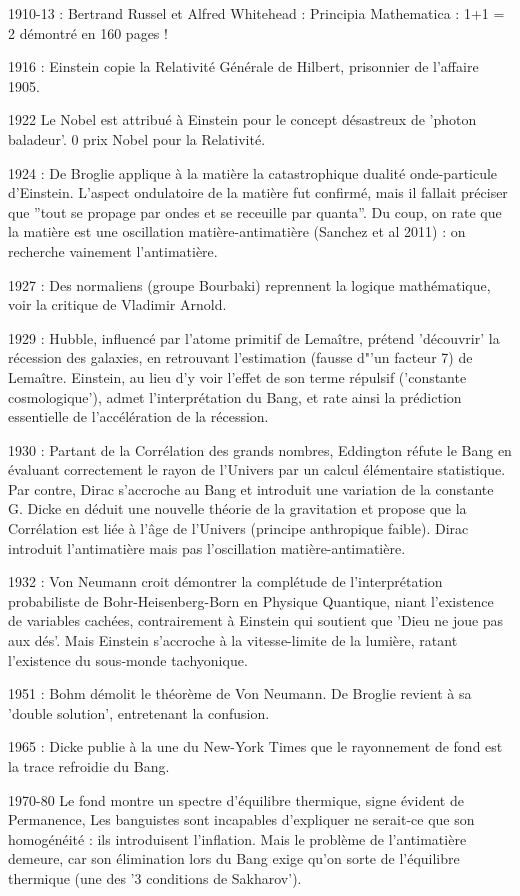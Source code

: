 \documentclass[a4paper,12pt]{article}
\begin{document}
1910-13 : Bertrand Russel et Alfred Whitehead : Principia Mathematica : 1+1 = 2 démontré en 160 pages ! 

1916 : Einstein copie la Relativité Générale de Hilbert, prisonnier de l'affaire 1905.

1922 Le Nobel est attribué à Einstein pour le concept désastreux de 'photon baladeur'. 0 prix Nobel pour la Relativité.

1924 : De Broglie applique à la matière la catastrophique dualité onde-particule d'Einstein. L'aspect ondulatoire de la matière fut confirmé, mais il fallait préciser que ''tout se propage par ondes et se receuille par quanta''. Du coup, on rate que la matière est une oscillation matière-antimatière (Sanchez et al 2011) : on recherche vainement l'antimatière.

1927 : Des normaliens (groupe Bourbaki) reprennent la logique mathématique, voir la critique de Vladimir Arnold.

1929 : Hubble, influencé par l'atome primitif de Lemaître, prétend 'découvrir' la récession des galaxies, en retrouvant l'estimation (fausse d"'un facteur 7) de Lema\^itre. Einstein, au lieu d'y voir l'effet de son terme répulsif ('constante cosmologique'), admet l'interprétation du Bang, et rate ainsi la prédiction essentielle de l'accélération de la récession.

1930 : Partant de la Corrélation des grands nombres, Eddington réfute le Bang en évaluant correctement le rayon de l'Univers par un calcul élémentaire statistique. Par contre, Dirac s'accroche au Bang et introduit une variation de la constante G. Dicke en déduit une nouvelle théorie de la gravitation et propose que la Corrélation est liée à l'âge de l'Univers (principe anthropique faible). Dirac introduit l'antimatière mais pas l'oscillation matière-antimatière.

1932 : Von Neumann croit démontrer la complétude de l'interprétation probabiliste de Bohr-Heisenberg-Born en Physique Quantique, niant l'existence de variables cachées, contrairement à Einstein qui soutient que 'Dieu ne joue pas aux dés'. Mais Einstein s'accroche à la vitesse-limite de la lumière, ratant l'existence du sous-monde tachyonique.

1951 : Bohm démolit le théorème de Von Neumann. De Broglie revient à sa 'double solution', entretenant la confusion.

1965 : Dicke publie à la une du New-York Times que le rayonnement de fond est la trace refroidie du Bang.

1970-80 Le fond montre un spectre d'équilibre thermique, signe évident de Permanence, Les banguistes sont incapables d'expliquer ne serait-ce que son homogénéité : ils introduisent l'inflation. Mais le problème de l'antimatière demeure, car son élimination lors du Bang exige qu'on sorte de l'équilibre thermique (une des '3 conditions de Sakharov').
\end{document}
